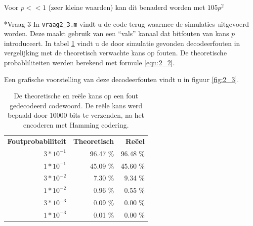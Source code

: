 \documentclass[]{article}
\begin{document}
\begin{section}
\begin{subsection}
        Voor $p << 1$ (zeer kleine waarden) kan dit benaderd worden
        met $105p^2$

    \end{subsection}

    \begin{subsection}*{Vraag 3} %
        In \texttt{vraag2\_3.m} vindt u de code terug waarmee de
        simulaties uitgevoerd worden. Deze maakt gebruik van een
        ``vals'' kanaal dat bitfouten van kans $p$ introduceert. In
        tabel \ref{tab:2_3} vindt u de door simulatie gevonden
        decodeerfouten in vergelijking met de theoretisch verwachte
        kans op fouten. De theoretische probabliliteiten werden
        berekend met formule \ref{eqn:2_2}.

        Een grafische voorstelling van deze decodeerfouten vindt u in
        figuur \ref{fig:2_3}.

        \begin{table}
            \centering
            \begin{tabular}{rrr}
                \textbf{Foutprobabiliteit} &
                \textbf{Theoretisch} &
                \textbf{Re\"eel} \\
                $3 * 10^{-1}$ & 96.47 \% & 96.48 \% \\
                $1 * 10^{-1}$ & 45.09 \% & 45.60 \% \\
                $3 * 10^{-2}$ &  7.30 \% &  9.34 \% \\
                $1 * 10^{-2}$ &  0.96 \% &  0.55 \% \\
                $3 * 10^{-3}$ &  0.09 \% &  0.00 \% \\
                $1 * 10^{-3}$ &  0.01 \% &  0.00 \%
            \end{tabular}
            \caption{De theoretische en re\"ele kans op een fout
                gedecodeerd codewoord. De re\"ele kans werd bepaald
                door 10000 bits te verzenden, na het encoderen met
            Hamming codering.}
            \label{tab:2_3}
        \end{table}


\end{subsection}
\end{section}
\end{document}
